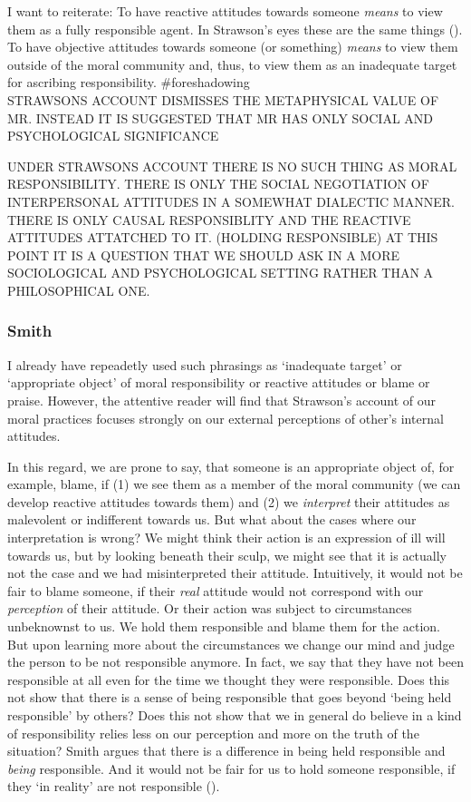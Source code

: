 \documentclass{article}
\newcounter{example}[section]
\begin{document}
I want to reiterate: To have reactive attitudes towards someone \textit{means}
to view them as a fully responsible agent. In Strawson's eyes these are the same
things (\cite[p.23]{Strawson1962}). To have objective attitudes towards someone (or something)
\textit{means} to view them outside of the moral community and, thus, to view
them as an inadequate target for ascribing responsibility. \#foreshadowing\\

STRAWSONS ACCOUNT DISMISSES THE METAPHYSICAL VALUE OF MR. INSTEAD IT IS
SUGGESTED THAT MR HAS ONLY SOCIAL AND PSYCHOLOGICAL SIGNIFICANCE

UNDER STRAWSONS ACCOUNT THERE IS NO SUCH THING AS MORAL RESPONSIBILITY. THERE IS
ONLY THE SOCIAL NEGOTIATION OF INTERPERSONAL ATTITUDES IN A SOMEWHAT DIALECTIC
MANNER. THERE IS ONLY CAUSAL RESPONSIBLITY AND THE REACTIVE ATTITUDES ATTATCHED
TO IT. (HOLDING RESPONSIBLE)
AT THIS POINT IT IS A QUESTION THAT WE SHOULD ASK IN A MORE SOCIOLOGICAL AND
PSYCHOLOGICAL SETTING RATHER THAN A PHILOSOPHICAL ONE.

\subsubsection{Smith}

 I already have repeadetly used such phrasings as `inadequate target' or
 `appropriate object' of moral responsibility or reactive attitudes or blame or
 praise. However, the attentive reader will find that Strawson's account of our
 moral practices focuses strongly on our external perceptions of other's
 internal attitudes.

 In this regard, we are prone to say, that someone is an
 appropriate object of, for example, blame, if (1) we see them as a member of the moral
 community (we can develop reactive attitudes towards them) and (2) we
 \textit{interpret} their attitudes as malevolent or indifferent towards us. But what
 about the cases where our interpretation is wrong? We might think their action
 is an expression of ill will towards us, but by looking beneath their sculp, we
 might see that it is actually not the case and we had misinterpreted their
 attitude. Intuitively, it would not be fair to blame someone, if their \textit{real}
 attitude would not correspond with our \textit{perception} of their attitude.
 Or their action was subject to circumstances unbeknownst to us. We hold them
 responsible and blame them for the action. But upon learning more about the
 circumstances we change our mind and judge the person to be not responsible
 anymore. In fact, we say that they have not been responsible at all even for the
 time we thought they were responsible. Does this not show that there is a sense
 of being responsible that goes beyond `being held responsible' by others? Does
 this not show that we in general do believe in a kind of responsibility relies
 less on our perception and more on the truth of the situation? 
 Smith argues that there is a difference in being held responsible and 
 \textit{being} responsible. And it would not be fair for us to hold someone
 responsible, if they `in reality' are not responsible (\cite[p.
 472]{Smith_2007}).\\
\end{document}
